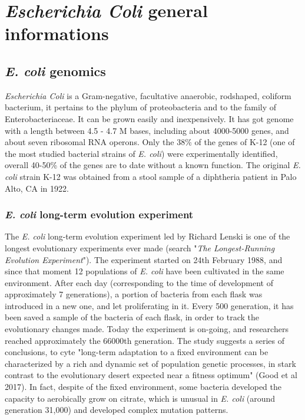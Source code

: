 \graphicspath{{chapters/images/01/}}

\chapter{\emph{Escherichia Coli} general informations}
\section{\emph{E. coli} genomics}
\emph{Escherichia Coli} is a Gram-negative, facultative anaerobic, rodshaped, coliform bacterium, it pertains to the phylum of proteobacteria and to the family of Enterobacteriaceae. It can be grown easily and inexpensively. It has got genome with a length between 4.5 - 4.7 M bases, including about 4000-5000 genes, and about seven ribosomal RNA operons. Only the 38\% of the genes of K-12 (one of the most studied bacterial strains of \emph{E. coli}) were experimentally identified, overall 40-50\% of the genes are to date without a known function.
The original \emph{E. coli} strain K-12 was obtained from a stool sample of a diphtheria patient in Palo Alto, CA in 1922.

\subsection{\emph{E. coli} long-term evolution experiment}
The \emph{E. coli} long-term evolution experiment led by Richard Lenski is one of the longest evolutionary experiments ever made (search "\textit{The Longest-Running Evolution Experiment}"). The experiment started on 24th February 1988, and since that moment 12 populations of \emph{E. coli} have been cultivated in the same environment. After each day (corresponding to the time of development of approximately 7 generations), a portion of bacteria from each flask was introduced in a new one, and let proliferating in it. Every 500 generation, it has been saved a sample of the bacteria of each flask, in order to track the evolutionary changes made. Today the experiment is on-going, and researchers reached approximately the 66000th generation. The study suggests a series of conclusions, to cyte "long-term adaptation to a fixed environment can be characterized by a rich and dynamic set of population genetic processes, in stark contrast to the evolutionary desert expected near a fitness optimum" (Good et al 2017). In fact, despite of the fixed environment, some bacteria developed the capacity to aerobically grow on citrate, which is unusual in \emph{E. coli} (around generation 31,000) and developed complex mutation patterns.


